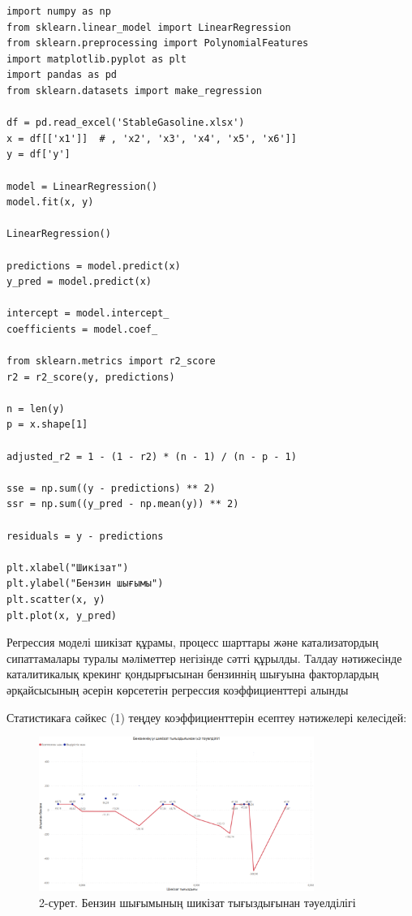 \small{
\begin{lstlisting}
import numpy as np
from sklearn.linear_model import LinearRegression
from sklearn.preprocessing import PolynomialFeatures
import matplotlib.pyplot as plt
import pandas as pd
from sklearn.datasets import make_regression

df = pd.read_excel('StableGasoline.xlsx')
x = df[['x1']]  # , 'x2', 'x3', 'x4', 'x5', 'x6']]
y = df['y']

model = LinearRegression()
model.fit(x, y)

LinearRegression()

predictions = model.predict(x)
y_pred = model.predict(x)

intercept = model.intercept_
coefficients = model.coef_

from sklearn.metrics import r2_score
r2 = r2_score(y, predictions)

n = len(y)
p = x.shape[1]

adjusted_r2 = 1 - (1 - r2) * (n - 1) / (n - p - 1)

sse = np.sum((y - predictions) ** 2)
ssr = np.sum((y_pred - np.mean(y)) ** 2)

residuals = y - predictions

plt.xlabel("Шикізат")
plt.ylabel("Бензин шығымы")
plt.scatter(x, y)
plt.plot(x, y_pred)
\end{lstlisting}}

\begin{multicols}{2}
Регрессия моделі шикізат құрамы, процесс шарттары және катализатордың
сипаттамалары туралы мәліметтер негізінде сәтті құрылды. Талдау
нәтижесінде каталитикалық крекинг қондырғысынан бензиннің шығуына
факторлардың әрқайсысының әсерін көрсететін регрессия коэффициенттері
алынды

Статистикаға сәйкес (1) теңдеу коэффициенттерін есептеу нәтижелері
келесідей:
\end{multicols}

\begin{figure}[H]
	\centering
	\includegraphics[width=0.8\textwidth]{media/ict/image95}
	\caption*{2-сурет. Бензин шығымының шикізат тығыздығынан тәуелділігі}
\end{figure}

